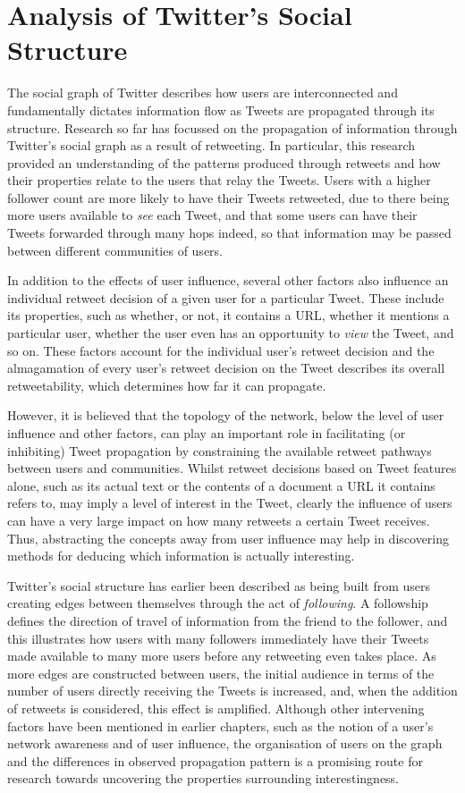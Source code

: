 \chapter{Analysis of Twitter's Social Structure}

The social graph of Twitter describes how users are interconnected and fundamentally dictates information flow as Tweets are propagated through its structure. Research so far has focussed on the propagation of information through Twitter's social graph as a result of retweeting. In particular, this research provided an understanding of the patterns produced through retweets and how their properties relate to the users that relay the Tweets. Users with a higher follower count are more likely to have their Tweets retweeted, due to there being more users available to \textit{see} each Tweet, and that some users can have their Tweets forwarded through many hops indeed, so that information may be passed between different communities of users.

In addition to the effects of user influence,  several other factors also influence an individual retweet decision of a given user for a particular Tweet. These include its properties, such as whether, or not, it contains a URL, whether it mentions a particular user, whether the user even has an opportunity to \textit{view} the Tweet, and so on. These factors account for the individual user's retweet decision and the almagamation of every user's retweet decision on the Tweet describes its overall retweetability, which determines how far it can propagate.

However, it is believed that the topology of the network, below the level of user influence and other factors, can play an important role in facilitating (or inhibiting) Tweet propagation by constraining the available retweet pathways between users and communities. Whilst retweet decisions based on Tweet features alone, such as its actual text or the contents of a document a URL it contains refers to, may imply a level of interest in the Tweet, clearly the influence of users can have a very large impact on how many retweets a certain Tweet receives. Thus, abstracting the concepts away from user influence may help in discovering methods for deducing which information is actually interesting.

Twitter's social structure has earlier been described as being built from users creating edges between themselves through the act of \textit{following}. A followship defines the direction of travel of information from the friend to the follower, and this illustrates how users with many followers immediately have their Tweets made available to many more users before any retweeting even takes place. As more edges are constructed between users, the initial audience in terms of the number of users directly receiving the Tweets is increased, and, when the addition of retweets is considered, this effect is amplified. Although other intervening factors have been mentioned in earlier chapters, such as the notion of a user's network awareness and of user influence, the organisation of users on the graph and the differences in observed propagation pattern is a promising route for research towards uncovering the properties surrounding interestingness.

